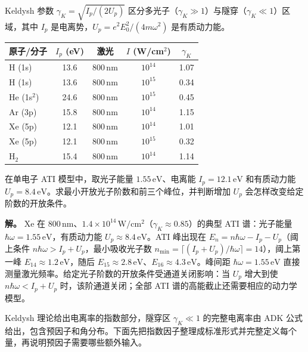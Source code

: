 Keldysh 参数 \(\gamma_K=\sqrt{I_p/(2U_p)}\) 区分多光子（\(\gamma_K\gg1\)）与隧穿（\(\gamma_K\ll1\)）区域，其中 \(I_p\) 是电离势，\(U_p=e^2E_0^2/(4m\omega^2)\) 是有质动力能。

\begin{center}
\begin{tabular}{lcccc}
\hline
原子/分子 & \(I_p\) (eV) & 激光 & \(I\) (W/cm\(^2\)) & \(\gamma_K\) \\
\hline
H (1s) & 13.6 & 800\,nm & \(10^{14}\) & 1.07 \\
H (1s) & 13.6 & 800\,nm & \(10^{15}\) & 0.34 \\
He (1s\(^2\)) & 24.6 & 800\,nm & \(10^{15}\) & 0.45 \\
Ar (3p) & 15.8 & 800\,nm & \(10^{14}\) & 1.15 \\
Xe (5p) & 12.1 & 800\,nm & \(10^{14}\) & 1.01 \\
Xe (5p) & 12.1 & 800\,nm & \(10^{15}\) & 0.32 \\
H\(_2\) & 15.4 & 800\,nm & \(10^{14}\) & 1.14 \\
\hline
\end{tabular}
\end{center}

\begin{exbox}[Xe 的 ATI 谱]
在单电子 ATI 模型中，取光子能量 $1.55\,\mathrm{eV}$、电离能 $I_p=12.1\,\mathrm{eV}$ 和有质动力能 $U_p=8.4\,\mathrm{eV}$。求最小开放光子阶数和前三个峰位，并判断增加 $U_p$ 会怎样改变给定阶数的开放条件。

\textbf{解。} Xe 在 800\,nm、\(1.4\times10^{14}\,\mathrm{W/cm^2}\)（\(\gamma_K\approx0.85\)）的典型 ATI 谱：光子能量 \(\hbar\omega=1.55\,\mathrm{eV}\)，有质动力能 \(U_p\approx8.4\,\mathrm{eV}\)。ATI 峰出现在 \(E_n=n\hbar\omega-I_p-U_p\)（阈上条件 \(n\hbar\omega>I_p+U_p\)，最小吸收光子数 \(n_{\min}=\lceil(I_p+U_p)/\hbar\omega\rceil=14\)），阈上第一峰 \(E_{14}\approx1.2\,\mathrm{eV}\)，随后 \(E_{15}\approx2.8\,\mathrm{eV}\)、\(E_{16}\approx4.3\,\mathrm{eV}\)。峰间距 \(\hbar\omega=1.55\,\mathrm{eV}\) 直接测量激光频率。给定光子阶数的开放条件受通道关闭影响：当 \(U_p\) 增大到使 \(n\hbar\omega<I_p+U_p\) 时，该阶通道关闭；全部 ATI 谱的高能截止还需要相应的动力学模型。
\end{exbox}

Keldysh 理论给出电离率的指数部分，隧穿区 $\gamma_K\ll1$ 的完整电离率由 ADK 公式给出，包含预因子和角分布。下面先把指数因子整理成标准形式并完整定义每个量，再说明预因子需要哪些额外输入。

